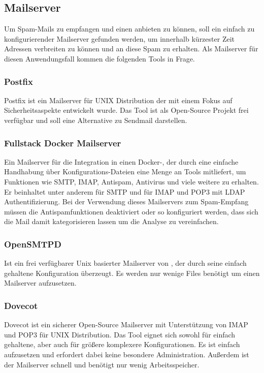 \documentclass[a4paper,11pt,singlespacing]{article}
\begin{document}
	\subsection{Mailserver}\label{sec:Mailserver}
		Um Spam-Mails zu empfangen und einen  anbieten zu können, soll ein einfach zu konfigurierender Mailserver gefunden werden, um innerhalb kürzester Zeit Adressen verbreiten zu können und an diese Spam zu erhalten.
		Als Mailserver für diesen Anwendungsfall kommen die folgenden Tools in Frage. 
		\subsubsection{Postfix}\label{sec:Postfix}
			Postfix ist ein Mailserver für UNIX Distribution der mit einem Fokus auf Sicherheitsaspekte entwickelt wurde. Das Tool ist als Open-Source Projekt frei verfügbar und soll eine Alternative zu Sendmail darstellen. \cite{postfix}
		\subsubsection{Fullstack Docker Mailserver}\label{sec:FullstackDockerMailserver}
			Ein Mailserver für die Integration in einen Docker-, der durch eine einfache Handhabung über Konfigurations-Dateien eine Menge an Tools mitliefert, um Funktionen wie SMTP, IMAP, Antispam, Antivirus und viele weitere zu erhalten. Er beinhaltet unter anderem  für SMTP und  für IMAP und  POP3 mit LDAP Authentifizierung. \cite{fullstackDockerMailserver} Bei der Verwendung dieses Mailservers zum Spam-Empfang müssen die Antispamfunktionen deaktiviert oder so konfiguriert werden, dass sich die Mail damit kategorisieren lassen um die Analyse zu vereinfachen.
		\subsubsection{OpenSMTPD}\label{sec:OpenSMTPD}
			Ist ein frei verfügbarer Unix basierter Mailserver von , der durch seine einfach gehaltene Konfiguration überzeugt. Es werden nur wenige Files benötigt um einen Mailserver aufzusetzen.
		\subsubsection{Dovecot}\label{sec:Dovecot}
		Dovecot ist ein sicherer Open-Source Mailserver mit Unterstützung von IMAP und POP3 für UNIX Distribution. Das Tool eignet sich sowohl für einfach gehaltene, aber auch für größere komplexere Konfigurationen. Es ist einfach aufzusetzen und erfordert dabei keine besondere Administration. Außerdem ist der Mailserver schnell und benötigt nur wenig Arbeitsspeicher. \cite{dovecot}
		
\end{document}
